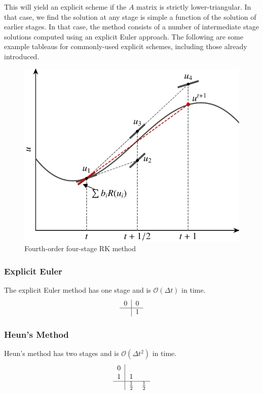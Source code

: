 This will yield an explicit scheme if the $A$ matrix is strictly lower-triangular. In that case, we find the solution at any stage is simple a function of the solution of earlier stages. In that case, the method consists of a number of intermediate stage solutions computed using an explicit Euler approach. The following are some example tableaus for commonly-used explicit schemes, including those already introduced.
\begin{figure}[htbp]
	\centering
	\includegraphics[width=0.6\linewidth]{Pictures/rk_method}
	\caption{Fourth-order four-stage RK method}
	\label{fig:midpoint_method}
\end{figure}

\subsubsection{Explicit Euler}
The explicit Euler method has one stage and is $\mathcal{O}(\Delta t)$ in time.
\begin{equation}
	\begin{tabular}{c|ccccc}
	0   & 0 \\
	\hline
	         & 1\\
	\end{tabular}
\end{equation}

\subsubsection{Heun's Method}
Heun's method has two stages and is $\mathcal{O}(\Delta t^2)$ in time.
\begin{equation}
	\begin{tabular}{c|ccccc}
	0 & \\
	1 & 1 \\
	\hline
	 & $\frac{1}{2}$ & $\frac{1}{2}$\\
	\end{tabular}
\end{equation}

